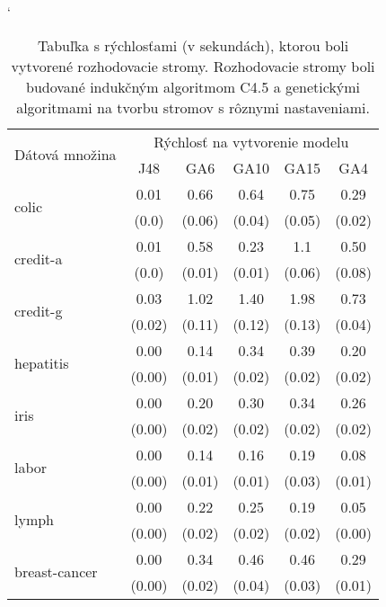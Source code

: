 \begin{table}[t]
\catcode`
\centering 
\newcommand\T{\rule{0pt}{2.6ex}}       %
\newcommand\B{\rule[-1.2ex]{0pt}{0pt}} %
\begin{tabular}{|l||c|c|c|c|c||}
\hline \multirow{2}{*}{Dátová množina} & \multicolumn{5}{|c||}{Rýchlosť na vytvorenie modelu} \\ 
\cline{2-6} & J48 & GA6 & GA10 & GA15 & GA4 \\
\hline
\hline \multirow{2}{*}{colic} & 0.01 & 0.66 & 0.64 & 0.75 & 0.29 \T\\[-1.5ex]
& \tiny (0.0) & \tiny (0.06) & \tiny (0.04) & \tiny (0.05) & \tiny (0.02)\B\\
\hline \multirow{2}{*}{credit-a} & 0.01 & 0.58 & 0.23 & 1.1 & 0.50 \T\\[-1.5ex]
& \tiny (0.0) & \tiny (0.01) & \tiny (0.01) & \tiny (0.06) & \tiny (0.08)\B\\
\hline \multirow{2}{*}{credit-g} & 0.03 & 1.02 & 1.40 & 1.98 & 0.73\T\\[-1.5ex]
& \tiny (0.02) & \tiny (0.11) & \tiny (0.12) & \tiny (0.13) & \tiny (0.04)\B\\
\hline \multirow{2}{*}{hepatitis} & 0.00 & 0.14 & 0.34 & 0.39 & 0.20 \T\\[-1.5ex]
& \tiny (0.00) & \tiny (0.01) & \tiny (0.02) & \tiny (0.02) & \tiny (0.02)\B\\
\hline \multirow{2}{*}{iris} & 0.00 & 0.20 & 0.30 & 0.34 & 0.26 \T\\[-1.5ex]
& \tiny (0.00) & \tiny (0.02) & \tiny (0.02) & \tiny (0.02) & \tiny (0.02)\B\\
\hline \multirow{2}{*}{labor} & 0.00 & 0.14 & 0.16 & 0.19 & 0.08 \T\\[-1.5ex]
& \tiny (0.00) & \tiny (0.01) & \tiny (0.01) & \tiny (0.03) & \tiny (0.01)\B\\
\hline \multirow{2}{*}{lymph} & 0.00 & 0.22 & 0.25 & 0.19 & 0.05 \T\\[-1.5ex]
& \tiny (0.00) & \tiny (0.02) & \tiny (0.02) & \tiny (0.02) & \tiny (0.00)\B\\
\hline \multirow{2}{*}{breast-cancer} & 0.00 & 0.34 & 0.46 & 0.46 & 0.29 \T\\[-1.5ex]
& \tiny (0.00) & \tiny (0.02) & \tiny (0.04) & \tiny (0.03) & \tiny (0.01)\B\\
\hline
\end{tabular}
\caption{Tabuľka s rýchlosťami (v sekundách), ktorou boli vytvorené rozhodovacie stromy. Rozhodovacie stromy boli budované indukčným algoritmom C4.5 a genetickými algoritmami na tvorbu stromov s rôznymi nastaveniami.}\label{fig:time}
\end{table}

